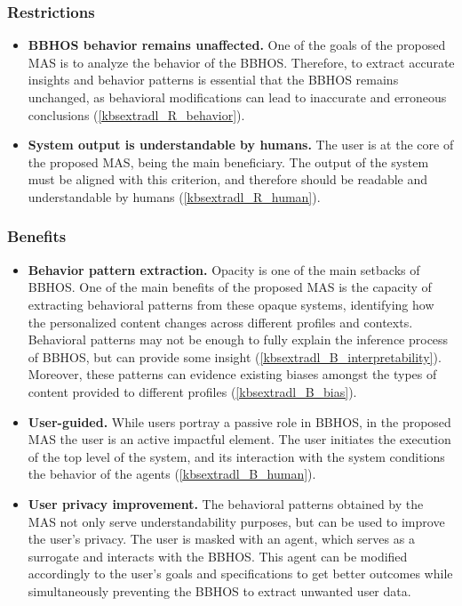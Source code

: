 \subsubsection*{Restrictions}
\begin{itemize}
    \item \textbf{BBHOS behavior remains unaffected.} One of the goals of the proposed MAS is to analyze the behavior of the BBHOS. Therefore, to extract accurate insights and behavior patterns is essential that the BBHOS remains unchanged, as behavioral modifications can lead to inaccurate and erroneous conclusions (\ref{kbsextradl_R_behavior}).
    
    \item \textbf{System output is understandable by humans.} The user is at the core of the proposed MAS, being the main beneficiary. The output of the system must be aligned with this criterion, and therefore should be readable and understandable by humans (\ref{kbsextradl_R_human}).
\end{itemize}

\subsubsection*{Benefits}
\begin{itemize}
    \item \textbf{Behavior pattern extraction.} Opacity is one of the main setbacks of BBHOS. One of the main benefits of the proposed MAS is the capacity of extracting behavioral patterns from these opaque systems, identifying how the personalized content changes across different profiles and contexts. Behavioral patterns may not be enough to fully explain the inference process of BBHOS, but can provide some insight (\ref{kbsextradl_B_interpretability}). Moreover, these patterns can evidence existing biases amongst the types of content provided to different profiles (\ref{kbsextradl_B_bias}).
    
    \item \textbf{User-guided.} While users portray a passive role in BBHOS, in the proposed MAS the user is an active impactful element. The user initiates the execution of the top level of the system, and its interaction with the system conditions the behavior of the agents (\ref{kbsextradl_B_human}). 
    
    \item \textbf{User privacy improvement.} The behavioral patterns obtained by the MAS not only serve understandability purposes, but can be used to improve the user's privacy. The user is masked with an agent, which serves as a surrogate and interacts with the BBHOS. This agent can be modified accordingly to the user's goals and specifications to get better outcomes while simultaneously preventing the BBHOS to extract unwanted user data. 
\end{itemize}
